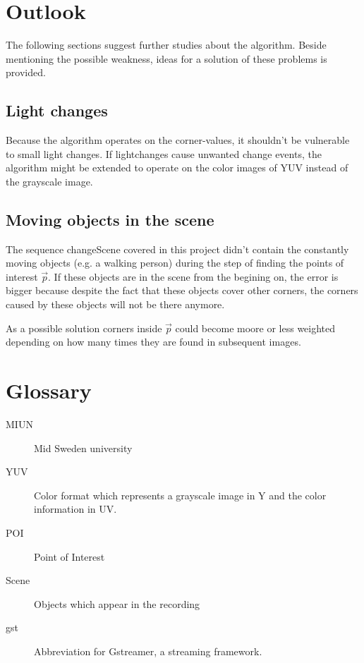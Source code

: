\chapter{Outlook}
The following sections suggest further studies about the algorithm. Beside mentioning the possible weakness, ideas for a solution of these problems is provided. 

\section{Light changes}
Because the algorithm operates on the corner-values, it shouldn't be vulnerable to small light changes. If lightchanges cause unwanted change events, the algorithm might be extended to operate on the color images of YUV instead of the grayscale image. 

\section{Moving objects in the scene}
The sequence changeScene covered in this project didn't contain the constantly moving objects (e.g. a walking person)  during the step of finding the points of interest $\vec{p} $. If these objects are in the scene from the begining on, the error is bigger because despite the fact that these objects cover other corners, the corners caused by these objects  will not be there anymore.

As a possible solution corners inside $\vec{p} $ could become moore or less weighted depending on how many times they are found in subsequent images.
\chapter{Glossary}
\begin{description}
	\item[MIUN] Mid Sweden university
	\item[YUV] Color format which represents a grayscale image in Y and the color information in UV.
	\item[POI] Point of Interest
	\item[Scene] Objects which appear in the recording
	\item[gst] 	Abbreviation for Gstreamer, a streaming framework.
\end{description}
